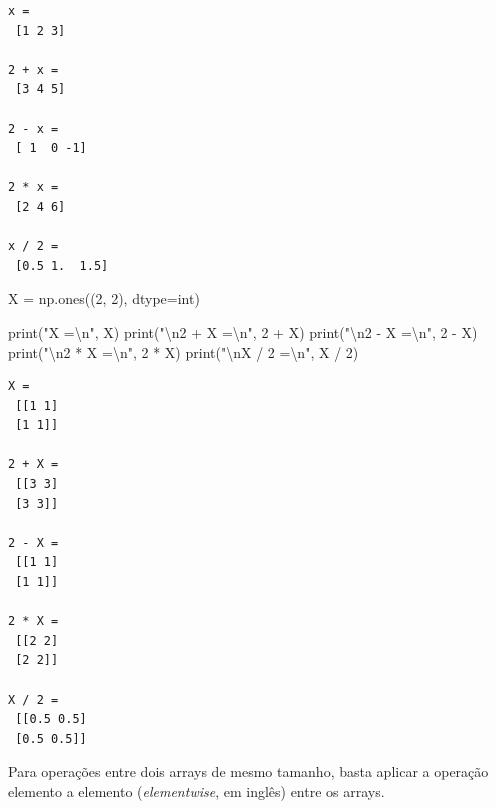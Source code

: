\documentclass[
  brazilian,
  letterpaper,
  DIV=11,
  numbers=noendperiod]{scrreprt}
\newenvironment{Shaded}{\begin{snugshade}}{\end{snugshade}}
\newcommand{\BuiltInTok}[1]{\textcolor[rgb]{0.00,0.23,0.31}{#1}}
\newcommand{\CharTok}[1]{\textcolor[rgb]{0.13,0.47,0.30}{#1}}
\newcommand{\DecValTok}[1]{\textcolor[rgb]{0.68,0.00,0.00}{#1}}
\newcommand{\NormalTok}[1]{\textcolor[rgb]{0.00,0.23,0.31}{#1}}
\newcommand{\OperatorTok}[1]{\textcolor[rgb]{0.37,0.37,0.37}{#1}}
\newcommand{\StringTok}[1]{\textcolor[rgb]{0.13,0.47,0.30}{#1}}
\begin{document}
\begin{verbatim}
x =
 [1 2 3]

2 + x =
 [3 4 5]

2 - x =
 [ 1  0 -1]

2 * x =
 [2 4 6]

x / 2 =
 [0.5 1.  1.5]
\end{verbatim}

\begin{Shaded}
\begin{Highlighting}[]
\NormalTok{X }\OperatorTok{=}\NormalTok{ np.ones((}\DecValTok{2}\NormalTok{, }\DecValTok{2}\NormalTok{), dtype}\OperatorTok{=}\BuiltInTok{int}\NormalTok{)}

\BuiltInTok{print}\NormalTok{(}\StringTok{"X =}\CharTok{\textbackslash{}n}\StringTok{"}\NormalTok{, X)}
\BuiltInTok{print}\NormalTok{(}\StringTok{"}\CharTok{\textbackslash{}n}\StringTok{2 + X =}\CharTok{\textbackslash{}n}\StringTok{"}\NormalTok{, }\DecValTok{2} \OperatorTok{+}\NormalTok{ X)}
\BuiltInTok{print}\NormalTok{(}\StringTok{"}\CharTok{\textbackslash{}n}\StringTok{2 {-} X =}\CharTok{\textbackslash{}n}\StringTok{"}\NormalTok{, }\DecValTok{2} \OperatorTok{{-}}\NormalTok{ X)}
\BuiltInTok{print}\NormalTok{(}\StringTok{"}\CharTok{\textbackslash{}n}\StringTok{2 * X =}\CharTok{\textbackslash{}n}\StringTok{"}\NormalTok{, }\DecValTok{2} \OperatorTok{*}\NormalTok{ X)}
\BuiltInTok{print}\NormalTok{(}\StringTok{"}\CharTok{\textbackslash{}n}\StringTok{X / 2 =}\CharTok{\textbackslash{}n}\StringTok{"}\NormalTok{, X }\OperatorTok{/} \DecValTok{2}\NormalTok{)}
\end{Highlighting}
\end{Shaded}

\begin{verbatim}
X =
 [[1 1]
 [1 1]]

2 + X =
 [[3 3]
 [3 3]]

2 - X =
 [[1 1]
 [1 1]]

2 * X =
 [[2 2]
 [2 2]]

X / 2 =
 [[0.5 0.5]
 [0.5 0.5]]
\end{verbatim}

Para operações entre dois arrays de mesmo tamanho, basta aplicar a
operação elemento a elemento (\emph{elementwise}, em inglês) entre os
arrays.
\end{document}
